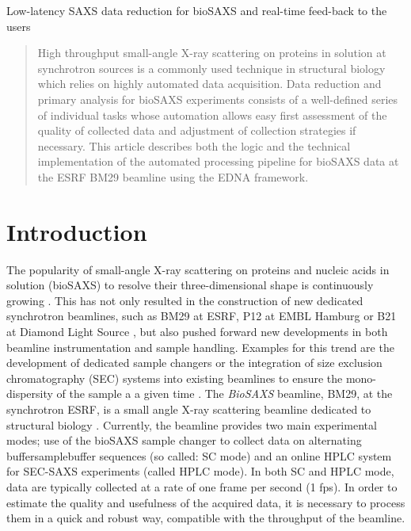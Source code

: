 \documentclass[preprint,pdf]{iucr}              %
\begin{document}

\maketitle                        %

\begin{synopsis}
Low-latency SAXS data reduction for bioSAXS and real-time feed-back to the users
\end{synopsis}

\begin{abstract}
High throughput small-angle X-ray scattering on proteins in solution at
synchrotron sources is a commonly used technique in structural biology which
relies on highly automated data acquisition.
Data reduction and primary analysis for bioSAXS experiments consists of a
well-defined series of individual tasks whose automation allows easy first
assessment of the quality of collected data and adjustment of collection strategies if necessary.
This article describes both the logic and the technical implementation of the
automated processing pipeline for bioSAXS data at the ESRF BM29 beamline using
the EDNA framework.
\end{abstract}


\section{Introduction}
The popularity of small-angle X-ray scattering on proteins and nucleic acids in
solution (bioSAXS) to resolve their three-dimensional shape is continuously
growing \cite{Graewert2013,Hura2009,Reyes2014}.
This has not only resulted in the construction of new dedicated
synchrotron beamlines, such as BM29 at ESRF, P12 at EMBL Hamburg or B21 at
Diamond Light Source \cite{BM29paper,P12,B21}, but also pushed forward new
developments in both beamline instrumentation and sample handling.
Examples for this trend are the development of dedicated sample changers
\cite{SCpaper} or the integration of size exclusion chromatography (SEC) systems
into existing beamlines to ensure the mono-dispersity of the sample a a given
time \cite{SECPaper2012,SECP12,SECSWING}.
The \textit{BioSAXS} beamline, BM29, at the synchrotron ESRF, is a small angle
X-ray scattering beamline dedicated to structural biology \cite{BM29paper}.
Currently, the beamline provides two main experimental modes; use of the
bioSAXS sample changer to collect data on alternating buffer\/sample\/buffer
sequences (so called: SC mode) and an online HPLC system \cite{SECPaper2012} for
SEC-SAXS experiments (called HPLC mode).
In both SC and HPLC mode, data are typically collected at a rate of one frame per second
(1 fps).
In order to estimate the quality and usefulness of the acquired data, it is
necessary to process them in a quick and robust way, compatible with the
throughput of the beamline.
\end{document}
